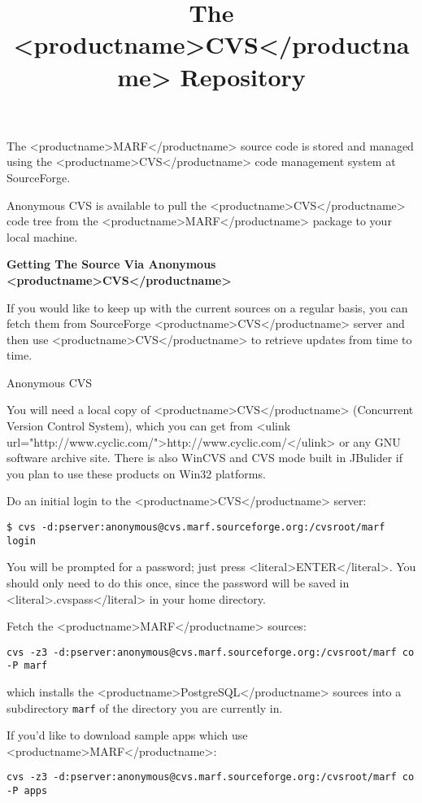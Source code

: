 \title{The <productname>CVS</productname> Repository}

  The <productname>MARF</productname> source code is stored and managed using the
  <productname>CVS</productname> code management system at SourceForge.

  Anonymous CVS
  is available to pull the <productname>CVS</productname> code tree from the
  <productname>MARF</productname> package to your local machine.

{\bf Getting The Source Via Anonymous <productname>CVS</productname>}

   If you would like to keep up with the current sources on a regular
   basis, you can fetch them from SourceForge <productname>CVS</productname> server
   and then use <productname>CVS</productname> to
   retrieve updates from time to time.

   Anonymous CVS

\item
     You will need a local copy of <productname>CVS</productname>
     (Concurrent Version Control System), which you can get from
     <ulink url="http://www.cyclic.com/">http://www.cyclic.com/</ulink> or
     any GNU software archive site. There is also WinCVS and
     CVS mode built in JBulider if you plan to use these products
     on Win32 platforms.

\item
     Do an initial login to the <productname>CVS</productname> server:

     \begin{verbatim}
$ cvs -d:pserver:anonymous@cvs.marf.sourceforge.org:/cvsroot/marf login
     \end{verbatim}

     You will be prompted for a password; just press <literal>ENTER</literal>.
     You should only need to do this once, since the password will be
     saved in <literal>.cvspass</literal> in your home directory.

\item
     Fetch the <productname>MARF</productname> sources:
     \begin{verbatim}
cvs -z3 -d:pserver:anonymous@cvs.marf.sourceforge.org:/cvsroot/marf co -P marf
     \end{verbatim}

     which installs the <productname>PostgreSQL</productname> sources into a
     subdirectory \verb+marf+
     of the directory you are currently in.

     If you'd like to download sample apps which use <productname>MARF</productname>:
\begin{verbatim}
cvs -z3 -d:pserver:anonymous@cvs.marf.sourceforge.org:/cvsroot/marf co -P apps
\end{verbatim}


